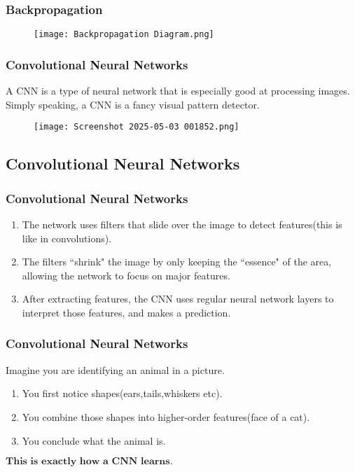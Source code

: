 \documentclass{beamer}
\begin{document}
\begin{frame}
\frametitle{Backpropagation}
\begin{tcolorbox}
[colback=blue!5!white,colframe=blue!75!black,title= Visualising Backpropagation]
\begin{figure}
    \centering
    \texttt{[image: Backpropagation Diagram.png]}
\end{figure}
\end{tcolorbox}
\end{frame}
\begin{frame}
\frametitle{Convolutional Neural Networks}
\begin{tcolorbox}
[colback=blue!5!white,colframe=blue!75!black,title= What is a Convolutional Neural Network(CNN)?]
A CNN is a type of neural network that is especially good at processing images. Simply speaking, a CNN is a fancy visual pattern detector.
\begin{figure}
    \centering
    \texttt{[image: Screenshot 2025-05-03 001852.png]}
\end{figure}
\end{tcolorbox}
\end{frame}
\begin{frame}
\section{Convolutional Neural Networks}
\frametitle{Convolutional Neural Networks}
\begin{tcolorbox}
[colback=blue!5!white,colframe=blue!75!black,title= How CNNs Work]
\begin{enumerate}
    \item The network uses filters that slide over the image to detect features(this is like in convolutions).
    \item The filters ``shrink" the image by only keeping the ``essence" of the area, allowing the network to focus on major features.
    \item After extracting features, the CNN uses regular neural network layers to interpret those features, and makes a prediction.
\end{enumerate}
\end{tcolorbox}
\end{frame}
\begin{frame}
\frametitle{Convolutional Neural Networks}
\begin{tcolorbox}
[colback=blue!5!white,colframe=blue!75!black,title=Making Sense of How Neural Networks Learn]
Imagine you are identifying an animal in a picture.\\
\begin{enumerate}
    \item You first notice shapes(ears,tails,whiskers etc).
    \item You combine those shapes into higher-order features(face of a cat).
    \item You conclude what the animal is.
\end{enumerate}
$\textbf{This is exactly how a CNN learns}.$
\end{tcolorbox}
\end{frame}
\end{document}
